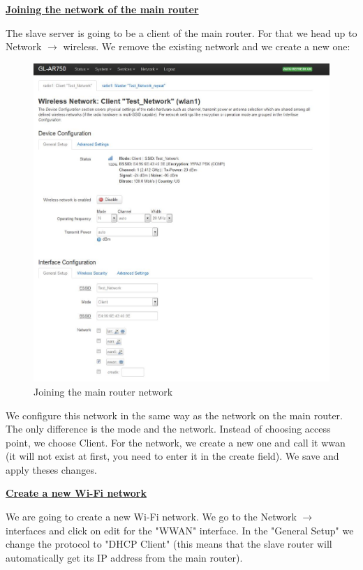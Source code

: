 \hfill \break \underline{\textbf{Joining the network of the main router}}

The slave server is going to be a client of the main router. For that we head up to Network $\rightarrow$ wireless. We remove the existing network and we create a new one:

\begin{figure}[H]
\begin{center}
\includegraphics[width=\columnwidth]{image/wireless4.jpg}%
\caption{Joining the main router network}%
\label{figure:wireless4}%
\end{center}
\end{figure}

We configure this network in the same way as the network on the main router. The only difference is the mode and the network. Instead of choosing access point, we choose Client. For the network, we create a new one and call it wwan (it will not exist at first, you need to enter it in the create field). We save and apply theses changes.

\hfill \break \underline{\textbf{Create a new Wi-Fi network}}

We are going to create a new Wi-Fi network. We go to the Network $\rightarrow$ interfaces and click on edit for the "WWAN" interface.
In the "General Setup" we change the protocol to "DHCP Client" (this means that the slave router will automatically get its IP address from the main router).



